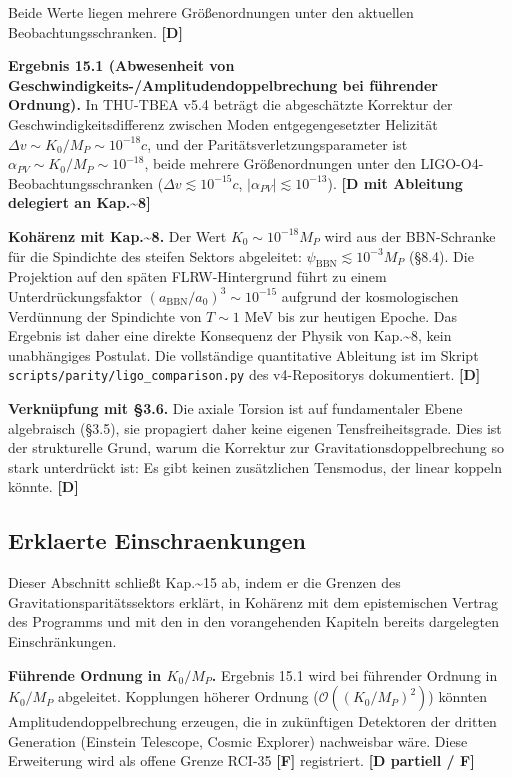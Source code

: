 ﻿\documentclass[11pt,letterpaper]{article}
\begin{document}
Beide Werte liegen mehrere Größenordnungen unter den aktuellen Beobachtungsschranken. \textbf{[D]}

\textbf{Ergebnis 15.1 (Abwesenheit von Geschwindigkeits-/Amplitudendoppelbrechung bei führender Ordnung).} In THU-TBEA v5.4 beträgt die abgeschätzte Korrektur der Geschwindigkeitsdifferenz zwischen Moden entgegengesetzter Helizität $\Delta v \sim K_0/M_P \sim 10^{-18}c$, und der Paritätsverletzungsparameter ist $\alpha_{PV} \sim K_0/M_P \sim 10^{-18}$, beide mehrere Größenordnungen unter den LIGO-O4-Beobachtungsschranken ($\Delta v \lesssim 10^{-15}c$, $|\alpha_{PV}| \lesssim 10^{-13}$). \textbf{[D mit Ableitung delegiert an Kap.\textasciitilde{}8]}

\textbf{Kohärenz mit Kap.\textasciitilde{}8.} Der Wert $K_0 \sim 10^{-18}M_P$ wird aus der BBN-Schranke für die Spindichte des steifen Sektors abgeleitet: $\psi_{\text{BBN}} \lesssim 10^{-3}M_P$ (§8.4). Die Projektion auf den späten FLRW-Hintergrund führt zu einem Unterdrückungsfaktor $(a_{\text{BBN}}/a_0)^3 \sim 10^{-15}$ aufgrund der kosmologischen Verdünnung der Spindichte von $T \sim 1$ MeV bis zur heutigen Epoche. Das Ergebnis ist daher eine direkte Konsequenz der Physik von Kap.\textasciitilde{}8, kein unabhängiges Postulat. Die vollständige quantitative Ableitung ist im Skript \texttt{scripts/parity/ligo\_comparison.py} des v4-Repositorys dokumentiert. \textbf{[D]}

\textbf{Verknüpfung mit §3.6.} Die axiale Torsion ist auf fundamentaler Ebene algebraisch (§3.5), sie propagiert daher keine eigenen Tensfreiheitsgrade. Dies ist der strukturelle Grund, warum die Korrektur zur Gravitationsdoppelbrechung so stark unterdrückt ist: Es gibt keinen zusätzlichen Tensmodus, der linear koppeln könnte. \textbf{[D]}
\subsection{Erklaerte Einschraenkungen}
Dieser Abschnitt schließt Kap.\textasciitilde{}15 ab, indem er die Grenzen des Gravitationsparitätssektors erklärt, in Kohärenz mit dem epistemischen Vertrag des Programms und mit den in den vorangehenden Kapiteln bereits dargelegten Einschränkungen.

\textbf{Führende Ordnung in $K_0/M_P$.} Ergebnis 15.1 wird bei führender Ordnung in $K_0/M_P$ abgeleitet. Kopplungen höherer Ordnung ($\mathcal{O}((K_0/M_P)^2)$) könnten Amplitudendoppelbrechung erzeugen, die in zukünftigen Detektoren der dritten Generation (Einstein Telescope, Cosmic Explorer) nachweisbar wäre. Diese Erweiterung wird als offene Grenze RCI-35 \textbf{[F]} registriert. \textbf{[D partiell / F]}
\end{document}
